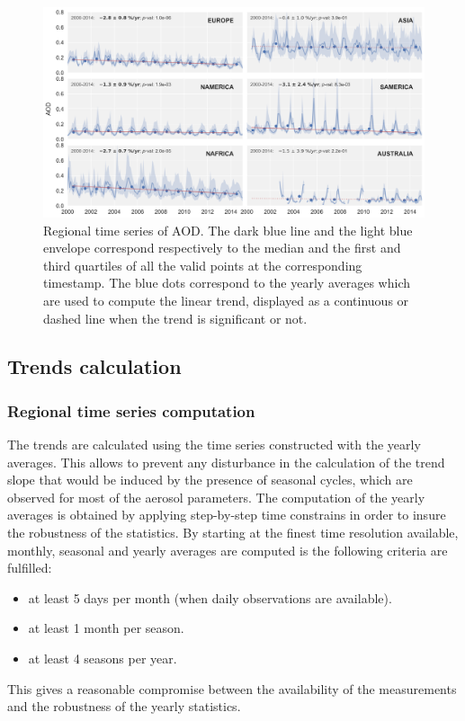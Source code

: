 \documentclass[journal abbreviation, manuscript]{copernicus}
\begin{document}
\begin{figure}
 \includegraphics[width=16cm]{../scripts/figs/ts/panel-od550aer.png}
 \caption{Regional time series of AOD. The dark blue line and the light blue envelope correspond respectively to the median and the first and third quartiles of all the valid points at the corresponding timestamp. The blue dots correspond to the yearly averages which are used to compute the linear trend, displayed as a continuous or dashed line when the trend is significant or not.}
 \label{fig:ts_aod}
\end{figure}


\subsection{Trends calculation}

\subsubsection{Regional time series computation}
The trends are calculated using the time series constructed with the yearly averages. This allows to prevent any disturbance in the calculation of the trend slope that would be induced by the presence of seasonal cycles, which are observed for most of the aerosol parameters. The computation of the yearly averages is obtained by applying step-by-step time constrains in order to insure the robustness of the statistics. By starting at the finest time resolution available, monthly, seasonal and yearly averages are computed is the following criteria are fulfilled:
\begin{itemize}
 \item at least 5 days per month (when daily observations are available).
 \item at least 1 month per season.
 \item at least 4 seasons per year.
\end{itemize}
This gives a reasonable compromise between the availability of the measurements and the robustness of the yearly statistics.
\end{document}

